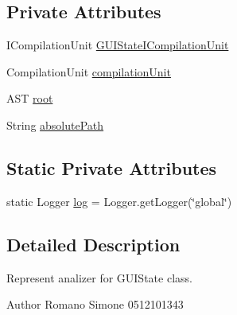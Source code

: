 \subsection*{Private Attributes}
\begin{DoxyCompactItemize}
\item 
I\-Compilation\-Unit \hyperlink{classit_1_1isislab_1_1masonassisteddocumentation_1_1mason_1_1analizer_1_1_g_u_i_state_analizer_a97ddb14f2f8fe4b54e6accc3bce4bee3}{G\-U\-I\-State\-I\-Compilation\-Unit}
\item 
Compilation\-Unit \hyperlink{classit_1_1isislab_1_1masonassisteddocumentation_1_1mason_1_1analizer_1_1_g_u_i_state_analizer_a8ecfe86ebe9c29d17c484244ff5bb535}{compilation\-Unit}
\item 
A\-S\-T \hyperlink{classit_1_1isislab_1_1masonassisteddocumentation_1_1mason_1_1analizer_1_1_g_u_i_state_analizer_a1f105131b365258edb70dfa04b51e87e}{root}
\item 
String \hyperlink{classit_1_1isislab_1_1masonassisteddocumentation_1_1mason_1_1analizer_1_1_g_u_i_state_analizer_a351edfd9f38d23c447a065fee702596b}{absolute\-Path}
\end{DoxyCompactItemize}
\subsection*{Static Private Attributes}
\begin{DoxyCompactItemize}
\item 
static Logger \hyperlink{classit_1_1isislab_1_1masonassisteddocumentation_1_1mason_1_1analizer_1_1_g_u_i_state_analizer_a4310c36f17a4205ae86067ce7c56b559}{log} = Logger.\-get\-Logger(\char`\"{}global\char`\"{})
\end{DoxyCompactItemize}


\subsection{Detailed Description}
Represent analizer for G\-U\-I\-State class. \begin{DoxyAuthor}{Author}
Romano Simone 0512101343 
\end{DoxyAuthor}


